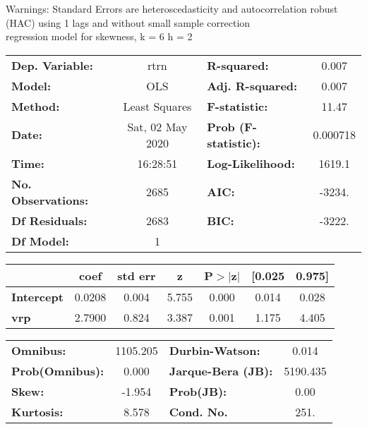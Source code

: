 Warnings: \newline
 [1] Standard Errors are heteroscedasticity and autocorrelation robust (HAC) using 1 lags and without small sample correction\\ 

regression model for skewness, k = 6 h = 2\begin{center}
\begin{tabular}{lclc}
\toprule
\textbf{Dep. Variable:}    &       rtrn       & \textbf{  R-squared:         } &     0.007   \\
\textbf{Model:}            &       OLS        & \textbf{  Adj. R-squared:    } &     0.007   \\
\textbf{Method:}           &  Least Squares   & \textbf{  F-statistic:       } &     11.47   \\
\textbf{Date:}             & Sat, 02 May 2020 & \textbf{  Prob (F-statistic):} &  0.000718   \\
\textbf{Time:}             &     16:28:51     & \textbf{  Log-Likelihood:    } &    1619.1   \\
\textbf{No. Observations:} &        2685      & \textbf{  AIC:               } &    -3234.   \\
\textbf{Df Residuals:}     &        2683      & \textbf{  BIC:               } &    -3222.   \\
\textbf{Df Model:}         &           1      & \textbf{                     } &             \\
\bottomrule
\end{tabular}
\begin{tabular}{lcccccc}
                   & \textbf{coef} & \textbf{std err} & \textbf{z} & \textbf{P$> |$z$|$} & \textbf{[0.025} & \textbf{0.975]}  \\
\midrule
\textbf{Intercept} &       0.0208  &        0.004     &     5.755  &         0.000        &        0.014    &        0.028     \\
\textbf{vrp}       &       2.7900  &        0.824     &     3.387  &         0.001        &        1.175    &        4.405     \\
\bottomrule
\end{tabular}
\begin{tabular}{lclc}
\textbf{Omnibus:}       & 1105.205 & \textbf{  Durbin-Watson:     } &    0.014  \\
\textbf{Prob(Omnibus):} &   0.000  & \textbf{  Jarque-Bera (JB):  } & 5190.435  \\
\textbf{Skew:}          &  -1.954  & \textbf{  Prob(JB):          } &     0.00  \\
\textbf{Kurtosis:}      &   8.578  & \textbf{  Cond. No.          } &     251.  \\
\bottomrule
\end{tabular}
\end{center}

